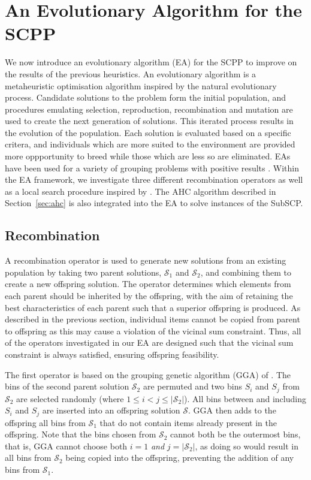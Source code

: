 \documentclass[authoryear]{elsarticle}
\begin{document}
\section{An Evolutionary Algorithm for the SCPP}
\label{sec:ea}
\noindent We now introduce an evolutionary algorithm (EA) for the SCPP to improve on the results of the previous heuristics. An evolutionary algorithm is a metaheuristic optimisation algorithm inspired by the natural evolutionary process. Candidate solutions to the problem form the initial population, and procedures emulating selection, reproduction, recombination and mutation are used to create the next generation of solutions. This iterated process results in the evolution of the population. Each solution is evaluated based on a specific critera, and individuals which are more suited to the environment are provided more oppportunity to breed while those which are less so are eliminated. EAs have been used for a variety of grouping problems with positive results \citep{lewis2017, falkenauer1996, quiroz2015}. Within the EA framework, we investigate three different recombination operators as well as a local search procedure inspired by \citet{martello1990l}. The AHC algorithm described in Section~\ref{sec:ahc} is also integrated into the EA to solve instances of the SubSCP.

\subsection{Recombination}
\label{sub:xover}
\noindent A recombination operator is used to generate new solutions from an existing population by taking two parent solutions, $\mathcal{S}_1$ and $\mathcal{S}_2$, and combining them to create a new offspring solution. The operator determines which elements from each parent should be inherited by the offspring, with the aim of retaining the best characteristics of each parent such that a superior offspring is produced. As described in the previous section, individual items cannot be copied from parent to offspring as this may cause a violation of the vicinal sum constraint. Thus, all of the operators investigated in our EA are designed such that the vicinal sum constraint is always satisfied, ensuring offspring feasibility.

The first operator is based on the grouping genetic algorithm (GGA) of \citet{falkenauer1992}. The bins of the second parent solution $\mathcal{S}_2$ are permuted and two bins $S_i$ and $S_j$ from $\mathcal{S}_2$ are selected randomly (where $1 \leq i < j \leq |\mathcal{S}_2|$). All bins between and including $S_i$ and $S_j$ are inserted into an offspring solution $\mathcal{S}$. GGA then adds to the offspring all bins from $\mathcal{S}_1$ that do not contain items already present in the offspring. Note that the bins chosen from $\mathcal{S}_2$ cannot both be the outermost bins, that is, GGA cannot choose both $i = 1$ \emph{and} $j = |\mathcal{S}_2|$, as doing so would result in all bins from $\mathcal{S}_2$ being copied into the offspring, preventing the addition of any bins from $\mathcal{S}_1$.
\end{document}

